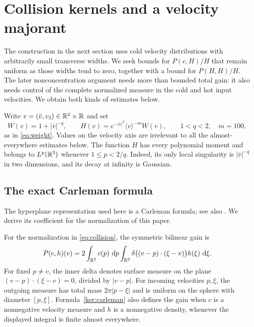 \section{Collision kernels and a velocity majorant}
\label{ker:section}

The construction in the next section uses cold velocity distributions
with arbitrarily small transverse widths. We seek bounds for
$P(c,H)/H$ that remain uniform as those widths tend to zero, together
with a bound for $P(H,H)/H$. The later nonconcentration argument needs
more than bounded total gain: it also needs control of the complete
normalized measure in the cold and hot input velocities. We obtain
both kinds of estimates below.

Write $v=(\bar v,v_3)\in\mathbb R^2\times\mathbb R$ and set
\[
 W(v)=1+|\bar v|^{-q},\qquad
 H(v)=e^{-|v|^2}\langle v\rangle^{-m}W(v),
 \qquad 1<q<2,\quad m=100,
\]
as in \eqref{eq:weight}. Values on the velocity axis are irrelevant to
all the almost-everywhere estimates below. The function $H$ has every
polynomial moment and belongs to $L^p(\mathbb R^3)$ whenever $1\leq p<2/q$.
Indeed, its only local singularity is $|\bar v|^{-q}$ in two dimensions,
and its decay at infinity is Gaussian.

\subsection{The exact Carleman formula}

The hyperplane representation used here is a Carleman formula;
see also \cite[Appendix~C]{GambaPanferovVillani2009}.
We derive its coefficient for the normalization of this paper.

\begin{lemma}\label{lem:carleman}
For the normalization in \eqref{eq:collision}, the symmetric bilinear
gain is
\begin{equation}\label{ker:carleman}
 P(c,h)(v)
 =2\int_{\mathbb R^3}c(p)\,\,\mathrm d p
       \int_{\mathbb R^3}
       \delta\bigl((v-p)\cdot(\xi-v)\bigr)h(\xi)\,\,\mathrm d\xi.
\end{equation}
For fixed $p\ne v$, the inner delta denotes surface measure on the
plane $(v-p)\cdot(\xi-v)=0$, divided by $|v-p|$.
For incoming velocities $p,\xi$, the outgoing measure has total mass
$2\pi|p-\xi|$ and is uniform on the sphere with diameter $[p,\xi]$.
Formula~\eqref{ker:carleman} also defines the gain when $c$ is a
nonnegative velocity measure and $h$ is a nonnegative density, whenever
the displayed integral is finite almost everywhere.
\end{lemma}

